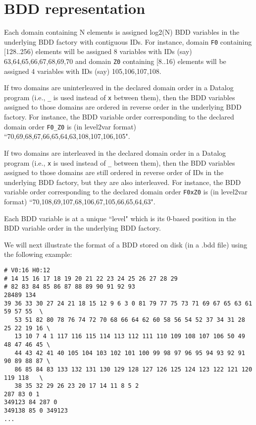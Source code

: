 \section{BDD representation}
\label{sec:bdd-representation}

Each domain containing N elements is assigned log2(N) BDD variables in the underlying BDD factory with contiguous IDs.
For instance,
domain {\tt F0} containing [128..256) elements will be assigned 8 variables with IDs (say) 63,64,65,66,67,68,69,70 and
domain {\tt Z0} containing [8..16) elements will be assigned 4 variables with IDs (say) 105,106,107,108.

If two domains are uninterleaved in the declared domain order in a Datalog program (i.e., {\tt \_} is used instead of {\tt x} between them),
then the BDD variables assigned to those domains are ordered in reverse order in the underlying BDD factory.
For instance, the BDD variable order corresponding to the declared domain order {\tt F0\_Z0} is (in level2var format)
``70,69,68,67,66,65,64,63,108,107,106,105".

If two domains are interleaved in the declared domain order in a Datalog program (i.e., {\tt x} is used instead of {\tt \_} between them),
then the BDD variables assigned to those domains are still ordered in reverse order of IDs in the underlying BDD factory,
but they are also interleaved.
For instance, the BDD variable order corresponding to the declared domain order {\tt F0xZ0} is (in level2var format)
``70,108,69,107,68,106,67,105,66,65,64,63".

Each BDD variable is at a unique ``level" which is its 0-based position in the BDD variable order in the underlying BDD factory.

We will next illustrate the format of a BDD stored on disk (in a .bdd file) using the following example:

\begin{verbatim}
# V0:16 H0:12
# 14 15 16 17 18 19 20 21 22 23 24 25 26 27 28 29
# 82 83 84 85 86 87 88 89 90 91 92 93
28489 134
39 36 33 30 27 24 21 18 15 12 9 6 3 0 81 79 77 75 73 71 69 67 65 63 61 59 57 55  \
   53 51 82 80 78 76 74 72 70 68 66 64 62 60 58 56 54 52 37 34 31 28 25 22 19 16 \
   13 10 7 4 1 117 116 115 114 113 112 111 110 109 108 107 106 50 49 48 47 46 45 \
   44 43 42 41 40 105 104 103 102 101 100 99 98 97 96 95 94 93 92 91 90 89 88 87 \
   86 85 84 83 133 132 131 130 129 128 127 126 125 124 123 122 121 120 119 118   \
   38 35 32 29 26 23 20 17 14 11 8 5 2
287 83 0 1
349123 84 287 0
349138 85 0 349123
...
\end{verbatim}

